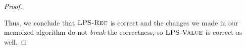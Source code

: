 \documentclass[11pt]{article}
\theoremstyle{nonumberplain}
\newtheorem{proof}{Proof}
\begin{document}
\begin{enumerate}
\begin{proof}
\begin{enumerate}
  \end{enumerate}
  Thus, we conclude that $\textnormal{\scshape LPS-Rec}$ is correct and the changes we made in our memoized algorithm do not \emph{break} the correctness, so $\textnormal{\scshape LPS-Value}$ is correct as well.
\end{proof}     

\end{enumerate}
\end{document}
